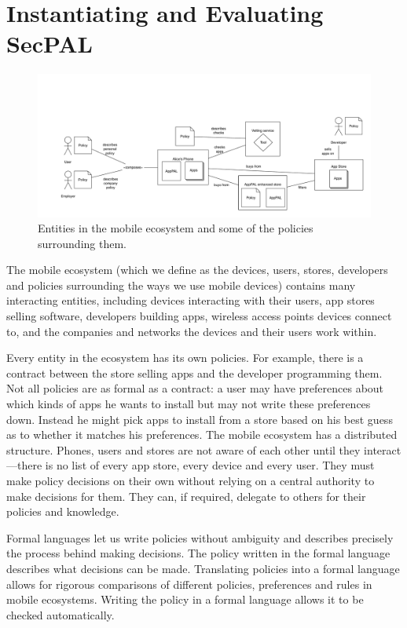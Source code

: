 \documentclass[thesis.tex]{subfiles}
\begin{document}
\chapter{Instantiating and Evaluating SecPAL}
\label{chap:apppal}

\begin{figure}
  \centering\noindent
  \includegraphics[width=\textwidth]{figures/policies-ecosystem.pdf}
  \medskip
  \caption[Entities in the mobile ecosystem]{Entities in the mobile ecosystem
    and some of the policies surrounding them.}
  \label{fig:ecosystem}
\end{figure}

The mobile ecosystem (which we define as the devices, users, stores, developers
and policies surrounding the ways we use mobile devices) contains many
interacting entities, including devices interacting with their users, app stores
selling software, developers building apps, wireless access points devices
connect to, and the companies and networks the devices and their users work
within.

Every entity in the ecosystem has its own policies. For example, there is a
contract between the store selling apps and the developer programming them. Not
all policies are as formal as a contract: a user may have preferences about
which kinds of apps he wants to install but may not write these preferences
down. Instead he might pick apps to install from a store based on his
best guess as to whether it matches his preferences. The mobile ecosystem has
a distributed structure. Phones, users and stores are not aware of each other
until they interact---there is no list of every app store, every device and
every user. They must make policy decisions on their own without relying on a
central authority to make decisions for them. They can, if required, delegate to
others for their policies and knowledge.

Formal languages let us write policies without ambiguity and describes precisely
the process behind making decisions. The policy written in the formal language
describes what decisions can be made. Translating policies into a formal
language allows for rigorous comparisons of different policies, preferences and
rules in mobile ecosystems. Writing the policy in a formal language allows it to
be checked automatically.
\end{document}
